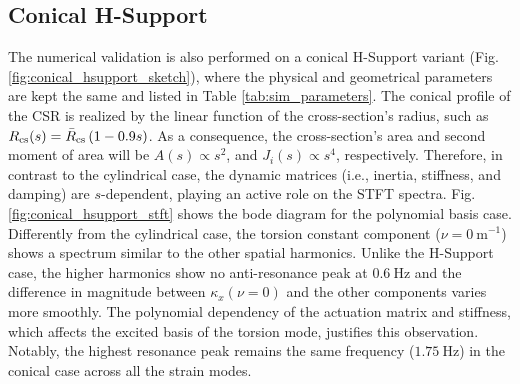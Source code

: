     \subsection{Conical H-Support} \label{numerical_validation:conical_hsupport}
    The numerical validation is also performed on a conical H-Support variant (Fig. \ref{fig:conical_hsupport_sketch}), where the physical and geometrical parameters are kept the same and listed in Table \ref{tab:sim_parameters}.
    The conical profile of the \ac{CSR} is realized by the linear function of the cross-section's radius, such as $R_{\textnormal{cs}}(s) = \bar{R}_{\textnormal{cs}} \left(1 -0.9 s\right)$.
    As a consequence, the cross-section's area and second moment of area will be $A(s) \propto s^2$, and $J_i(s) \propto s^4$, respectively.
    Therefore, in contrast to the cylindrical case, the dynamic matrices (i.e., inertia, stiffness, and damping) are $s$-dependent, playing an active role on the \ac{STFT} spectra.   
    Fig. \ref{fig:conical_hsupport_stft} shows the bode diagram for the polynomial basis case.
    Differently from the cylindrical case, the torsion constant component ($\nu = \SI{0}{\meter^{-1}}$) shows a spectrum similar to the other spatial harmonics.
    Unlike the H-Support case, the higher harmonics show no anti-resonance peak at $\SI{0.6}{\hertz}$ and the difference in magnitude between $\kappa_x(\nu = 0)$ and the other components varies more smoothly. The polynomial dependency of the actuation matrix and stiffness, which affects the excited basis of the torsion mode, justifies this observation.
    Notably, the highest resonance peak remains the same frequency ($\SI{1.75}{\hertz}$) in the conical case across all the strain modes.

